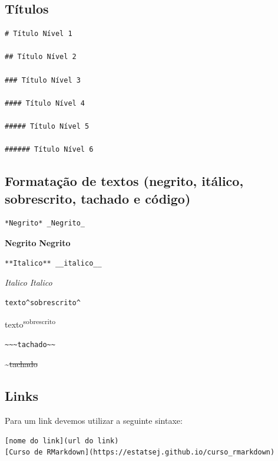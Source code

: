 \documentclass[
]{book}
\begin{document}
\hypertarget{tuxedtulos}{%
\subsection{Títulos}\label{tuxedtulos}}

\begin{verbatim}
# Título Nível 1

## Título Nível 2

### Título Nível 3

#### Título Nível 4

##### Título Nível 5

###### Título Nível 6
\end{verbatim}

\hypertarget{formatauxe7uxe3o-de-textos-negrito-ituxe1lico-sobrescrito-tachado-e-cuxf3digo}{%
\subsection{Formatação de textos (negrito, itálico, sobrescrito, tachado e código)}\label{formatauxe7uxe3o-de-textos-negrito-ituxe1lico-sobrescrito-tachado-e-cuxf3digo}}

\begin{verbatim}
*Negrito* _Negrito_
\end{verbatim}

\textbf{Negrito} \textbf{Negrito}

\begin{verbatim}
**Italico** __italico__
\end{verbatim}

\emph{Italico} \emph{Italico}

\begin{verbatim}
texto^sobrescrito^
\end{verbatim}

texto\textsuperscript{sobrescrito}

\begin{verbatim}
~~~tachado~~
\end{verbatim}

\textasciitilde{}\sout{tachado}

\hypertarget{links}{%
\subsection{Links}\label{links}}

Para um link devemos utilizar a seguinte sintaxe:

\begin{verbatim}
[nome do link](url do link)
[Curso de RMarkdown](https://estatsej.github.io/curso_rmarkdown)
\end{verbatim}
\end{document}
